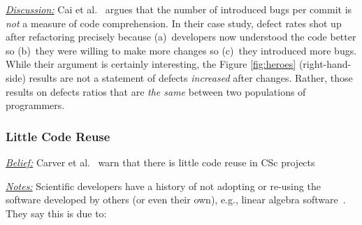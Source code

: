 \documentclass[conference,10pt]{IEEEtran}
\begin{document}




\noindent \textit{\underline{Discussion:}} 
Cai et al.~\cite{cai19_debt} argues that the number of introduced bugs
per commit is {\em not} a measure of code comprehension.
In their case study, defect rates shot up after refactoring
precisely because (a)~developers now understood the code better so (b)~they were willing to make more changes so (c)~they
introduced more bugs. While their argument is certainly interesting, the Figure \ref{fig:heroes} (right-hand-side) results
are not a statement of defects {\em increased} after changes.
Rather, those results on defects ratios that are {\em the same} between two populations of programmers. \\


\subsubsection{Little Code Reuse}\label{tion:reuse} 

\noindent \textit{\underline{Belief:}} 
Carver et al.~\cite{segal_enduser, carver06_hpc, Shull05_parallel, sanders08_risk} warn that there is little
code reuse in CSc projects

\noindent \textit{\underline{Notes:}} 
Scientific developers have a history of not adopting or re-using the software developed by others (or even their own), e.g., linear algebra software~\cite{johan18_secs}. They 
say this is due to:
\end{document}
